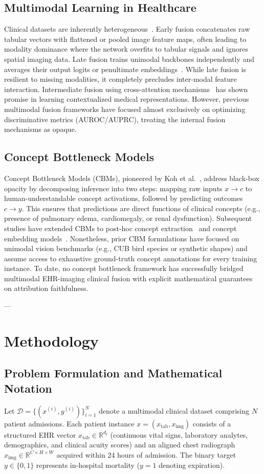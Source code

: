 \documentclass[10pt,journal,compsoc,twocolumn]{IEEEtran}
\begin{document}
\subsection{Multimodal Learning in Healthcare}
Clinical datasets are inherently heterogeneous~\cite{huang2020fusion}. Early fusion concatenates raw tabular vectors with flattened or pooled image feature maps, often leading to modality dominance where the network overfits to tabular signals and ignores spatial imaging data. Late fusion trains unimodal backbones independently and averages their output logits or penultimate embeddings~\cite{chen2022pan}. While late fusion is resilient to missing modalities, it completely precludes inter-modal feature interaction. Intermediate fusion using cross-attention mechanisms~\cite{vaswani2017attention} has shown promise in learning contextualized medical representations. However, previous multimodal fusion frameworks have focused almost exclusively on optimizing discriminative metrics (AUROC/AUPRC), treating the internal fusion mechanisms as opaque.

\subsection{Concept Bottleneck Models}
Concept Bottleneck Models (CBMs), pioneered by Koh et al.~\cite{koh2020concept}, address black-box opacity by decomposing inference into two steps: mapping raw inputs $x \to c$ to human-understandable concept activations, followed by predicting outcomes $c \to y$. This ensures that predictions are direct functions of clinical concepts (e.g., presence of pulmonary edema, cardiomegaly, or renal dysfunction). Subsequent studies have extended CBMs to post-hoc concept extraction~\cite{yuksekgonul2022posthoc} and concept embedding models~\cite{zarlenga2022concept}. Nonetheless, prior CBM formulations have focused on unimodal vision benchmarks (e.g., CUB bird species or synthetic shapes) and assume access to exhaustive ground-truth concept annotations for every training instance. To date, no concept bottleneck framework has successfully bridged multimodal EHR-imaging clinical fusion with explicit mathematical guarantees on attribution faithfulness.

---

\section{Methodology}

\subsection{Problem Formulation and Mathematical Notation}
Let $\mathcal{D} = \{(x^{(i)}, y^{(i)})\}_{i=1}^N$ denote a multimodal clinical dataset comprising $N$ patient admissions. Each patient instance $x = (x_{\text{tab}}, x_{\text{img}})$ consists of a structured EHR vector $x_{\text{tab}} \in \mathbb{R}^{d_t}$ (continuous vital signs, laboratory analytes, demographics, and clinical acuity scores) and an aligned chest radiograph $x_{\text{img}} \in \mathbb{R}^{C \times H \times W}$ acquired within 24 hours of admission. The binary target $y \in \{0, 1\}$ represents in-hospital mortality ($y=1$ denoting expiration).
\end{document}
